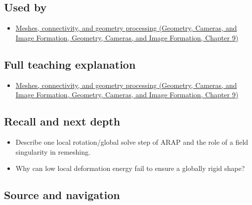 \subsection{Used by}\label{appendix-7107009c505b-used-by}

\begin{itemize}
\tightlist
\item
  \href{../03-Geometry-Cameras-and-Image-Formation/main.pdf\#nameddest=03-visual-computing-i-ch002-meshes-connectivity-and-geometry-processing}{Meshes, connectivity, and geometry processing (Geometry, Cameras, and Image Formation, Geometry, Cameras, and Image Formation, Chapter 9)}
\end{itemize}

\subsection{Full teaching explanation}\label{appendix-7107009c505b-full-teaching-explanation}

\begin{itemize}
\tightlist
\item
  \href{../03-Geometry-Cameras-and-Image-Formation/main.pdf\#nameddest=03-visual-computing-i-ch002-meshes-connectivity-and-geometry-processing}{Meshes, connectivity, and geometry processing (Geometry, Cameras, and Image Formation, Geometry, Cameras, and Image Formation, Chapter 9)}
\end{itemize}

\subsection{Recall and next depth}\label{appendix-7107009c505b-recall-and-next-depth}

\begin{itemize}
\tightlist
\item
  Describe one local rotation/global solve step of ARAP and the role of a field singularity in remeshing.
\item
  Why can low local deformation energy fail to ensure a globally rigid shape?
\end{itemize}

\subsection{Source and navigation}\label{appendix-7107009c505b-source-and-navigation}

